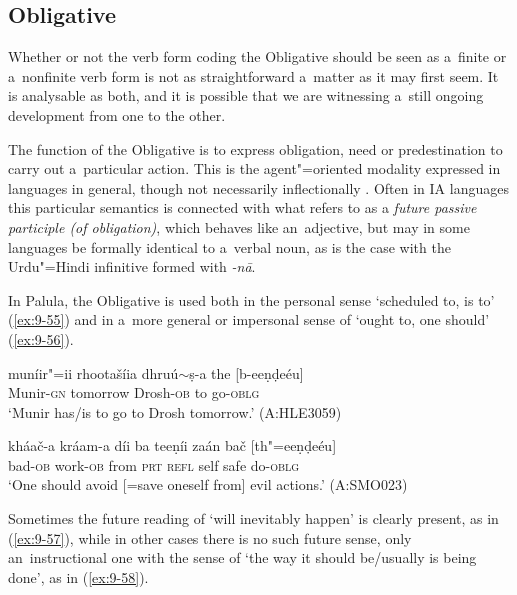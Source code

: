 \subsection{Obligative}
\label{subsec:9-2-3}

Whether or not the verb form coding the Obligative should be seen as a~finite or a~nonfinite verb form is not as straightforward a~matter as it may first seem. It is analysable as both, and it is possible that we are witnessing a~still ongoing development from one to the other. 



The function of the Obligative is to express obligation, need or predestination to carry out a~particular action. This is the agent"=oriented modality expressed in languages in general, though not necessarily inflectionally \citep[177--187]{bybeeetal1994}. Often in IA languages this particular semantics is connected with what \citet[322]{masica1991} refers to as a \textit{future passive participle (of obligation)}, which behaves like an~adjective, but may in some languages be formally identical to a~verbal noun, as is the case with the Urdu"=Hindi infinitive formed with \textit{-nā}. 



In Palula, the Obligative is used both in the personal sense `scheduled to, is to' (\ref{ex:9-55}) and in a~more general or impersonal sense of `ought to, one should' (\ref{ex:9-56}).

\begin{exe}
\ex
\label{ex:9-55}
\gll muníir"=ii rhootašíia dhruú$\sim$ṣ-a the [b-eeṇḍeéu] \\
Munir-\textsc{gn } tomorrow Drosh-\textsc{ob} to go-\textsc{oblg} \\
\glt `Munir has/is to go to Drosh tomorrow.' (A:HLE3059)

\ex
\label{ex:9-56}
\gll kháač-a kráam-a díi ba teeṇíi zaán bač [th"=eeṇḍeéu] \\
bad-\textsc{ob} work-\textsc{ob} from \textsc{prt} \textsc{refl} self safe do-\textsc{oblg} \\
\glt `One should avoid [=save oneself from] evil actions.' (A:SMO023)
\end{exe}

Sometimes the future reading of `will inevitably happen' is clearly present, as in (\ref{ex:9-57}), while in other cases there is no such future sense, only an~instructional one with the sense of `the way it should be/usually is being done', as in (\ref{ex:9-58}).

